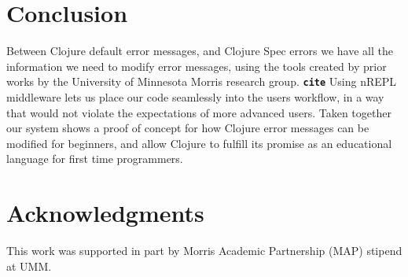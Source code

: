 \documentclass[12pt]{article}
\newcommand{\comment}[1]{{\bf \tt  {#1}}}
\newcommand{\emcomment}[1]{\textcolor{ForestGreen}{\comment{Elena: {#1}}}}
\begin{document}
\section{Conclusion}
Between Clojure default error messages, and Clojure Spec errors
we have all the information we need to modify error messages, using the
tools created by prior works by the University of Minnesota Morris research group. \comment{cite}
Using nREPL middleware lets us place our code seamlessly into the users
workflow, in a way that would not violate the expectations of more advanced users.
 Taken together our system shows a proof of concept for how Clojure
error messages can be modified for beginners, and allow Clojure to fulfill
its promise as an educational language for first time programmers.






\section{Acknowledgments}
This work was supported in part by Morris Academic Partnership (MAP) stipend at UMM.




\end{document}
